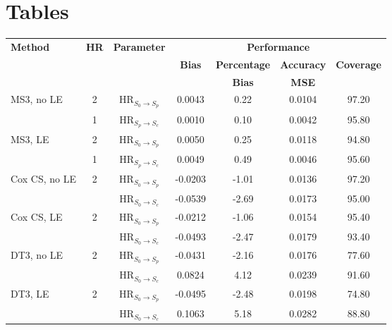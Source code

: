 \section{Tables}

\begin{table}[h!]
\footnotesize
\centering
\begin{threeparttable}
\begin{tabular}{l|c|c|c|c|c|c}
\toprule
\textbf{Method} & \textbf{HR} & \textbf{Parameter} &\multicolumn{4}{c}{\textbf{Performance}\tnote{a,b}} \\ \cline{4-7}
& & & \textbf{Bias} & \textbf{Percentage} & \textbf{Accuracy}  &  \textbf{Coverage}  \\
& & & & \textbf{Bias} &   \textbf{MSE}\\
\midrule
\multirow{2}{*}{\parbox{0.2\textwidth}{MS3, no LE}} & 2 & HR$_{S_0 \rightarrow S_p}$ &0.0043&	0.22& 0.0104	& 97.20\\
& 1 & HR$_{S_p \rightarrow S_c}$ & 0.0010	& 0.10	& 0.0042	&95.80\\
\cmidrule{1-7}
\multirow{2}{*}{\parbox{0.2\textwidth}{MS3, LE}} & 2 & HR$_{S_0 \rightarrow S_p}$ &0.0050&	0.25	&0.0118&	94.80\\
& 1 & HR$_{S_p \rightarrow S_c}$ & 0.0049&	0.49&	0.0046 & 95.60\\
\midrule
\multirow{2}{*}{\parbox{0.2\textwidth}{Cox CS, no LE}} & \multirow{2}{*}{2} & HR$_{S_0 \rightarrow S_p}$ &-0.0203&-1.01&0.0136&	97.20\\
&& HR$_{S_0 \rightarrow S_c}$ &-0.0539&-2.69&0.0173&95.00\\
\cmidrule{1-7}
\multirow{2}{*}{\parbox{0.2\textwidth}{Cox CS, LE}} & \multirow{2}{*}{2} & HR$_{S_0 \rightarrow S_p}$ &-0.0212&-1.06&	0.0154&	95.40\\
&& HR$_{S_0 \rightarrow S_c}$ & -0.0493&-2.47&0.0179&93.40\\
\midrule
\multirow{2}{*}{\parbox{0.2\textwidth}{DT3, no LE}} & \multirow{2}{*}{2} & HR$_{S_0 \rightarrow S_p}$ &-0.0431&	-2.16&	0.0176&	77.60\\
&& HR$_{S_0 \rightarrow S_c}$ &0.0824&	4.12	&0.0239 & 91.60\\
\cmidrule{1-7}
\multirow{2}{*}{\parbox{0.2\textwidth}{DT3, LE}} & \multirow{2}{*}{2} & HR$_{S_0 \rightarrow S_p}$ &-0.0495&	-2.48&	0.0198&	74.80\\
&& HR$_{S_0 \rightarrow S_c}$ &0.1063& 5.18&0.0282&	88.80\\
\bottomrule
\end{tabular}
\begin{tablenotes}\scriptsize

\end{tablenotes}
\end{threeparttable}
\end{table}
